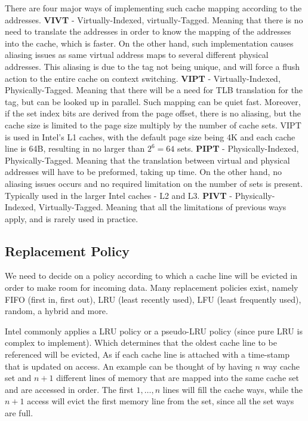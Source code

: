 There are four major ways of implementing such cache mapping according to the
addresses. \textbf{VIVT} - Virtually-Indexed, virtually-Tagged. Meaning that
there is no need to translate the addresses in order to know the mapping of the
addresses into the cache, which is faster. On the other hand, such
implementation causes aliasing issues as same virtual address maps to several
different physical addresses. This aliasing is due to the tag not being unique,
and will force a flush action to the entire cache on context switching.
\textbf{VIPT} - Virtually-Indexed, Physically-Tagged. Meaning that there will be
a need for TLB translation for the tag, but can be looked up in parallel. Such
mapping can be quiet fast. Moreover, if the set index bits are derived from the
page offset, there is no aliasing, but the cache size is limited to the page
size multiply by the number of cache sets. VIPT is used in Intel's L1 caches,
with the default page size being 4K and each cache line is 64B, resulting in no
larger than $2^6 = 64$ sets. \textbf{PIPT} - Physically-Indexed,
Physically-Tagged. Meaning that the translation between virtual and physical
addresses will have to be preformed, taking up time. On the other hand, no
aliasing issues occurs and no required  limitation on the number of sets is
present. Typically used in the larger Intel caches - L2 and L3. \textbf{PIVT} -
Physically-Indexed, Virtually-Tagged. Meaning that all the limitations of
previous ways apply, and is rarely used in practice. 

\subsection{Replacement Policy} 
\label{subsec:replacementpolicy}
We need to decide on a policy according to which a cache line will be evicted in
order to make room for incoming data. Many replacement policies exist, namely
FIFO (first in, first out), LRU (least recently used), LFU (least frequently
used), random, a hybrid and more.

Intel commonly applies a LRU policy or a pseudo-LRU policy (since pure LRU is
complex to implement). Which determines that the oldest cache line to be
referenced will be evicted, As if each cache line is attached with a time-stamp
that is updated on access. An example can be thought of by having $n$ way cache
set and $n+1$ different lines of memory that are mapped into the same cache set and
are accessed in order. The first $1,\dots,n$ lines will fill the cache ways,
while the $n+1$ access will evict the first memory line from the set, since all
the set ways are full.  

